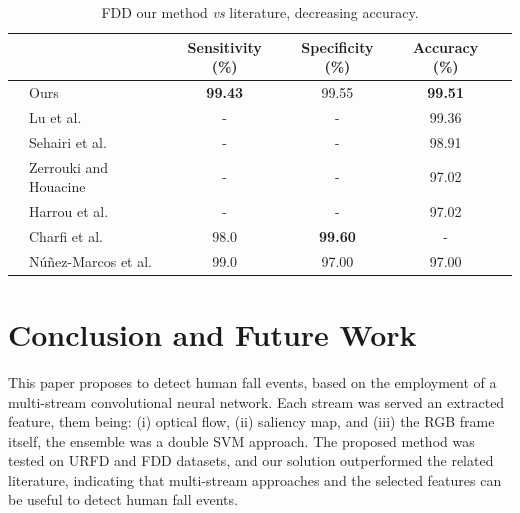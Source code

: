 \documentclass[conference]{IEEEtran}
\begin{document}
\begin{table}[t]
\centering
\caption{FDD our method \textit{vs} literature, decreasing accuracy.}
\label{tab:fdd-our-their}
\begin{tabular}{llcccl}
\hline
 &                                                      & Sensitivity (\%)  & Specificity (\%)  & Accuracy (\%)     & \\ \hline
 & Ours                                                 & \textbf{99.43}    & 99.55             & \textbf{99.51}    & \\
 & Lu et al.~\cite{lu2018deep}                          & -                 & -                 & 99.36             & \\
 & Sehairi et al.~\cite{sehairi2018elderly}             & -                 & -                 & 98.91             & \\
 & Zerrouki and Houacine~\cite{zerrouki2018combined}    & -                 & -                 & 97.02             & \\
 & Harrou et al.~\cite{harrou2017vision}                & -                 & -                 & 97.02             & \\
 & Charfi et al.~\cite{charfi2012definition}            & 98.0              & \textbf{99.60}    & -                 & \\
 & N\'u\~nez-Marcos et al.~\cite{nunez2017vision}       & 99.0              & 97.00             & 97.00             & \\ \hline
\end{tabular}
\end{table}
 
\section{Conclusion and Future Work}
\label{sec:conclusion}

This paper proposes to detect human fall events, based on the employment of a multi-stream convolutional neural network. Each stream was served an extracted feature, them being: (i) optical flow, (ii) saliency map, and (iii) the RGB frame itself, the ensemble was a double SVM approach. The proposed method was tested on URFD and FDD datasets, and our solution outperformed the related literature, indicating that multi-stream approaches and the selected features can be useful to detect human fall events.
\end{document}
